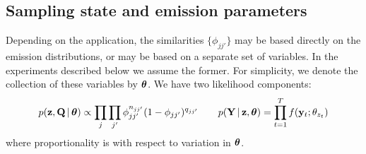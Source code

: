 \subsection{Sampling state and emission parameters}
\label{sec:sampling-eta}

Depending on the application, the similarities $\{\phi_{jj'}\}$ may be based
directly on the emission distributions, or may be based on a separate set
of variables.  In the experiments described below we assume the
former.  For simplicity, we denote the collection of these variables
by $\boldsymbol{\theta}$.  We have two likelihood components:
\begin{align}
  \label{eq:65}
  p(\mathbf{z}, \mathbf{Q} \, \vert \, \boldsymbol{\theta}) \propto \prod_{j}\prod_{j'}
  \phi_{jj'}^{n_{jj'}}(1-\phi_{jj'})^{q_{jj'}} \qquad
  p(\mathbf{Y} \, \vert \, \mathbf{z}, \boldsymbol{\theta}) = \prod_{t=1}^T f(\mathbf{y}_t; \theta_{z_t})
\end{align}
where proportionality is with respect to variation in $\boldsymbol{\theta}$.




